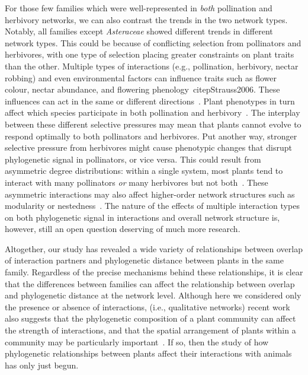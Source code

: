 \documentclass[12pt]{article}
\begin{document}
\begin{spacing}{1.5}
    For those few families which were well-represented in \emph{both} pollination
  and herbivory networks, we can also contrast the 
  trends in the two network types. Notably, all families except \emph{Asteraceae} 
  showed different trends in different network types. 
  This could be because of conflicting selection from pollinators and herbivores,
  with one type of selection placing greater constraints on plant traits than the other.
  Multiple types of interactions (e.g., pollination, herbivory, nectar robbing) 
  and even environmental factors can influence traits such as 
  flower colour, nectar abundance, and flowering phenology~citep{Strauss2006}. 
  These influences can act in the same or different directions~\citep{Strauss2006}.
  Plant phenotypes in turn affect which species participate in both pollination and herbivory~\citep{Strauss1997,Strauss2002,Adler2004,Adler2006,Theis2006}.
  The interplay between these different selective pressures may mean that plants
  cannot evolve to respond optimally to both pollinators and herbivores. Put another
  way, stronger selective pressure from herbivores might cause phenotypic changes
  that disrupt phylogenetic signal in pollinators, or vice versa. This could result from
  asymmetric degree distributions: within a single system, most plants tend to interact
  with many pollinators \emph{or} many herbivores but not both~\citep{Melian2009,Pockock2012,Astegiano2017}.
  These asymmetric interactions may also affect higher-order network structures such as
  modularity or nestedness~\citep{Astegiano2017}. The nature of the effects of multiple interaction types on both phylogenetic signal in interactions and overall network structure is, however, still an open question deserving of much more research.


  Altogether, our study has revealed a wide variety of relationships 
  between overlap of interaction partners and phylogenetic distance 
  between plants in the same family. Regardless of the precise mechanisms
  behind these relationships, it is clear
  that the differences between families can affect the relationship
  between overlap and phylogenetic distance at the network level.  
  Although here we considered only the presence or absence of interactions,
  (i.e., qualitative networks)
  recent work also suggests that the phylogenetic composition of a plant
  community can affect the strength of 
  interactions, and that the spatial arrangement of plants within a 
  community may be particularly important~\citep{Yguel2011,Castagneyrol2014}.
  If so, then the study of how phylogenetic relationships between plants
  affect their interactions with animals has only just begun.



\end{spacing}
\end{document}
